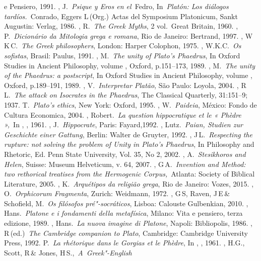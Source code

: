 {\begin{bibliohedra}
  e Pensiero, 1991.
, J.~\emph{Psique y Eros en el~}Fedro, In~\emph{Platón: Los
  diálogos tardíos.}~Conrado, Eggers L\,(Org.) Actas del Symposium
  Platonicum, Sankt Augustin: Verlag, 1986.
, R.~\emph{The Greek Myths}, 2 vol.~Great Britain, 1960.
, P.~\emph{Dicionário da Mitologia grega e romana}, Rio de
  Janeiro: Bertrand, 1997.
, W\,K\,C.~\emph{The Greek philosophers}, London: Harper
  Colophon, 1975.
, W.K.C.~\emph{Os sofistas}, Brasil: Paulus, 1991.
, M.~\emph{The unity of Plato's Phaedrus}, In Oxford Studies in
  Ancient Philosophy, volume , Oxford, p.151--173, 1989.
, M.~\emph{The unity of the Phaedrus: a postscript}, In Oxford
  Studies in Ancient Philosophy, volume , Oxford, p.189--191, 1989.
, V.~\emph{Interpretar Platão}, São Paulo: Loyola, 2004.
, R\,L.~\emph{The attack on Isocrates in the Phaedrus}, The
  Classical Quarterly, 31:151--9; 1937.
 T.~\emph{Plato's ethics}, New York: Oxford, 1995.
, W.~\emph{Paideia}, México: Fondo de Cultura Economica, 2004.
, Robert.~\emph{La question hippocratique et le « Phèdre »,}~In
  , , 1961.
, J.~\emph{Hippocrate}, Paris: Fayard,1992.
, Lutz.~\emph{Paian, Studien zur Geschichte einer Gattung},
  Berlin: Walter de Gruyter, 1992.
, J\,L.~\emph{Respecting the rupture: not solving the problem
  of Unity in Plato's Phaedrus}, In Philosophy and Rhetoric, Ed. Penn
  State University, Vol. 35, No 2, 2002.
, A.~\emph{Stesikhoros and Helen}, Suisse: Museum Helveticum, v.
  64, 2007.
, G\,A.~\emph{Invention and Method: two rethorical treatises
  from the Hermogenic Corpus,}~Atlanta: Society of Biblical Literature,
  2005.
, K.~\emph{Arquétipos da religião grega}, Rio de Janeiro:
  Vozes, 2015.
, O.~\emph{Orphicorum Fragmenta}, Zurich: Weidmann, 1972.
, G\,S, Raven, J\,E\,\& Schofield, M.~\emph{Os filósofos
  pré"-socráticos}, Lisboa: Calouste Gulbenkian, 2010.
, Hans.~\emph{Platone e i fondamenti della metafísica}, Milano:
  Vita e pensiero, terza edizione, 1989.
, Hans.~\emph{La nuova imagine di Platone}, Napoli: Bibliopolis,
  1986.
, R\,(ed.)~\emph{The Cambridge companion to Plato}, Cambridge:
  Cambridge University Press, 1992.
 P.~\emph{La rhétorique dans le Gorgias et le Phèdre}, In
  , , 1961.
, H.G., Scott, R\,\& Jones, H\,S.,~\emph{A~Greek"-English
}
\end{bibliohedra}}
